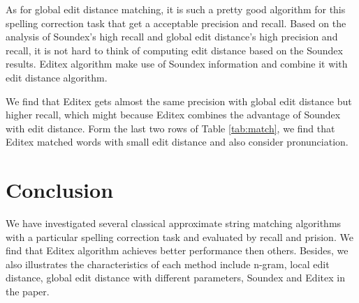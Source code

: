 \documentclass[11pt]{article}
\begin{document}
As for global edit distance matching, it is such a pretty good algorithm for this spelling correction task that get a acceptable precision and recall. Based on the analysis of Soundex's high recall and global edit distance's high precision and recall, it is not hard to think of computing edit distance based on the Soundex results. Editex algorithm make use of Soundex information and combine it with edit distance algorithm. 

We find that Editex gets almost the same precision with global edit distance but higher recall, which might because Editex combines the advantage of Soundex with edit distance. Form the last two rows of Table \ref{tab:match}, we find that Editex matched words with small edit distance and also consider pronunciation. 


\section{Conclusion}

We have investigated several classical approximate string matching algorithms with a particular spelling correction task and evaluated by recall and prision. We find that Editex algorithm achieves better performance then others. Besides,  we also illustrates the characteristics of each method include n-gram, local edit distance, global edit distance with different parameters, Soundex and Editex in the paper. 




\end{document}
